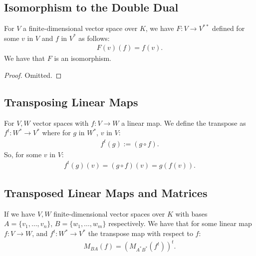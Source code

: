 \subsection{Isomorphism to the Double Dual}

For $V$ a finite-dimensional vector space over $K$, 
we have $F: V \to V^{**}$ defined for some $v$ in $V$ and $f$ in $V^*$ 
as follows: \begin{gather*}
  F(v)(f) = f(v).
\end{gather*} We have that $F$ is an isomorphism.
\begin{proof}
    Omitted.
\end{proof}

\subsection{Transposing Linear Maps}

For $V, W$ vector spaces with $f : V \to W$ a linear map. We define
the transpose as $f^t : W^* \to V^*$ where for $g$ in $W^*$, $v$ in
$V$: \begin{gather*}
  f^t(g) := (g \circ f).
\end{gather*} So, for some $v$ in $V$: \begin{gather*}
  f^t(g)(v) = (g \circ f)(v) = g(f(v)).
\end{gather*}

\subsection{Transposed Linear Maps and Matrices}

If we have $V, W$ finite-dimensional vector spaces over $K$ with bases 
$A = \{v_1, \ldots, v_n\}$, $B = \{w_1, \ldots, w_m\}$ respectively.
We have that for some linear map $f : V \to W$, and
$f^t : W^* \to V^*$ the transpose map with respect to $f$: \begin{gather*}
  M_{BA}(f) = \left( M_{A^*B^*}(f^t) \right)^t.
\end{gather*}